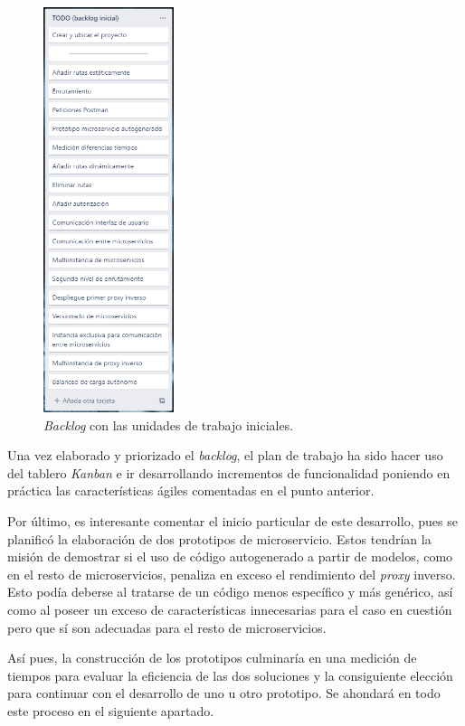 \documentclass[11pt,spanish,listoffigures]{tfgetsinf}
\begin{document}
\begin{figure}[ht]
\centering
\includegraphics[width=0.34\textwidth]{imagenes/backlogInicial}
\caption{\emph{Backlog} con las unidades de trabajo iniciales.}
	\label{kanbanInicial}
\end{figure}

Una vez elaborado y priorizado el \emph{backlog}, el plan de trabajo ha sido hacer uso del tablero \emph{Kanban} e ir desarrollando incrementos de funcionalidad poniendo en práctica las características ágiles comentadas en el punto anterior.

Por último, es interesante comentar el inicio particular de este desarrollo, pues se planificó la elaboración de dos prototipos de microservicio. Estos tendrían la misión de demostrar si el uso de código autogenerado a partir de modelos, como en el resto de microservicios, penaliza en exceso el rendimiento del \emph{proxy} inverso. Esto podía deberse al tratarse de un código menos específico y más genérico, así como al poseer un exceso de características innecesarias para el caso en cuestión pero que sí son adecuadas para el resto de microservicios.

Así pues, la construcción de los prototipos culminaría en una medición de tiempos para evaluar la eficiencia de las dos soluciones y la consiguiente elección para continuar con el desarrollo de uno u otro prototipo. Se ahondará en todo este proceso en el siguiente apartado.
\end{document}
